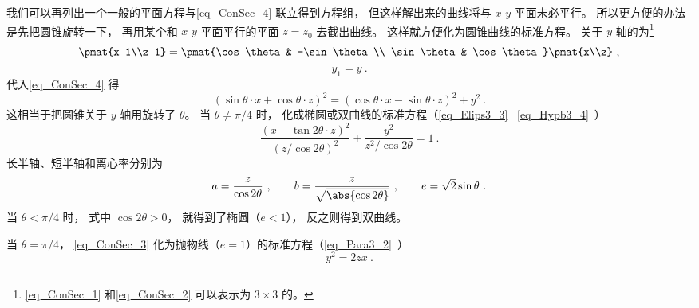 我们可以再列出一个一般的平面方程与\autoref{eq_ConSec_4} 联立得到方程组， 但这样解出来的曲线将与 $x$-$y$ 平面未必平行。 所以更方便的办法是先把圆锥旋转一下， 再用某个和 $x$-$y$ 平面平行的平面 $z = z_0$ 去截出曲线。 这样就方便化为圆锥曲线的标准方程。 关于 $y$ 轴的为\footnote{\autoref{eq_ConSec_1} 和\autoref{eq_ConSec_2} 可以表示为 $3\times 3$ 的。}
\begin{equation}\label{eq_ConSec_1}
\pmat{x_1\\z_1} = \pmat{\cos\theta & -\sin\theta\\ \sin\theta & \cos\theta}\pmat{x\\z}~,
\end{equation}
\begin{equation}\label{eq_ConSec_2}
y_1 = y~.
\end{equation}
代入\autoref{eq_ConSec_4} 得
\begin{equation}\label{eq_ConSec_3}
(\sin\theta\cdot x + \cos\theta\cdot z)^2 = (\cos\theta\cdot x - \sin\theta\cdot z)^2 + y^2~.
\end{equation}
这相当于把圆锥关于 $y$ 轴用旋转了 $\theta$。 当 $\theta \ne \pi/4$ 时， 化成椭圆或双曲线的标准方程（\autoref{eq_Elips3_3}~ \autoref{eq_Hypb3_4}~）
\begin{equation}
\frac{(x - \tan2\theta \cdot z)^2}{(z/\cos2\theta)^2} + \frac{y^2}{z^2/\cos2\theta} = 1~.
\end{equation}
长半轴、短半轴和离心率分别为
\begin{equation}
a = \frac{z}{\cos2\theta}~,
\qquad
b = \frac{z}{\sqrt{\abs{\cos2\theta}}}~,
\qquad
e = \sqrt{2}\sin\theta~.
\end{equation}
当 $\theta < \pi/4$ 时， 式中 $\cos2\theta > 0$， 就得到了椭圆（$e < 1$）， 反之则得到双曲线。

当 $\theta = \pi/4$， \autoref{eq_ConSec_3} 化为抛物线（$e = 1$）的标准方程（\autoref{eq_Para3_2}~）
\begin{equation}
y^2 = 2zx~.
\end{equation}

